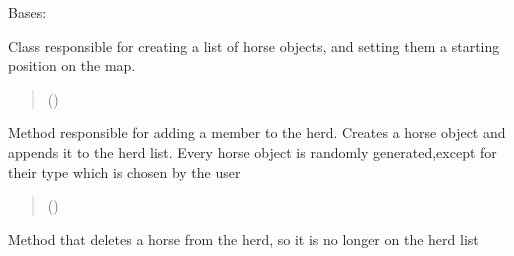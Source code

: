 \documentclass[letterpaper,10pt,english]{sphinxmanual}
\begin{document}
\begin{fulllineitems}
\label{\detokenize{main_package:main_package.Herd.Herd}}
\pysigstartsignatures
{}
\pysigstopsignatures
\sphinxAtStartPar
Bases: 

\sphinxAtStartPar
Class responsible for creating a list of horse objects, and setting them a starting position on the map.
\begin{quote}\begin{description}
\sphinxAtStartPar
{} ()

\end{description}\end{quote}

\begin{fulllineitems}
\label{\detokenize{main_package:main_package.Herd.Herd.add_member}}
\pysigstartsignatures
{}
\pysigstopsignatures
\sphinxAtStartPar
Method responsible for adding a member to the herd. Creates a horse object and appends it to the herd list.
Every horse object is randomly generated,except for their type which is chosen by the user
\begin{quote}\begin{description}
\sphinxAtStartPar
{} ()

\end{description}\end{quote}

\end{fulllineitems}


\begin{fulllineitems}
\label{\detokenize{main_package:main_package.Herd.Herd.delete_member}}
\pysigstartsignatures
{}
\pysigstopsignatures
\sphinxAtStartPar
Method that deletes a horse from the herd, so it is no longer on the herd list


\end{fulllineitems}
\end{fulllineitems}
\end{document}

